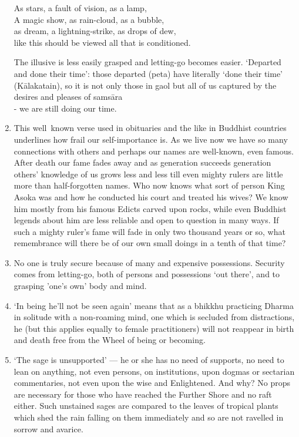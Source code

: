 \begin{enumerate}
\begin{MyDescription}{}
As stars, a fault of vision, as a lamp,\\
A magic show, as rain-cloud, as a bubble,\\
as dream, a lightning-strike, as drops of dew,\\
like this should be viewed all that is conditioned.
\end{MyDescription}
The illusive is less easily grasped and letting-go becomes easier. `Departed and done their time': those departed (peta) have literally `done their time' (K\=alakatain), so it is not only those in gaol but all of us captured by the desires and pleases of sams\=ara\\
- we are still doing our time.\\

\item This well~known verse used in obituaries and the like in Buddhist countries underlines how frail our self-importance is. As we live now we have so many connections with others and perhaps our names are well-known, even famous. After death our fame fades away and as generation succeeds generation others' knowledge of us grows less and less till even mighty rulers are little more than half-forgotten names. Who now knows what sort of person King Asoka was and how he conducted his court and treated his wives? We know him mostly from his famous Edicts carved upon rocks, while even Buddhist legends about him are less reliable and open to question in many ways. If such a mighty ruler's fame will fade in only two thousand years or so, what remembrance will there be of our own small doings in a tenth of that time?

\item No one is truly secure because of many and expensive possessions. Security comes from letting-go, both of persons and possessions `out there', and to grasping 'one's own' body and mind.

\item `In being he'll not be seen again' means that as a bhikkhu practicing Dharma in solitude with a non-roaming mind, one which is secluded from distractions, he (but this applies equally to female practitioners) will not reappear in birth and death free from the Wheel of being or becoming.\\

\item `The sage is unsupported' — he or she has no need of supports, no need to lean on anything, not even persons, on institutions, upon dogmas or sectarian commentaries, not even upon the wise and Enlightened. And why? No props are necessary for those who have reached the Further Shore and no raft either. Such unstained sages are compared to the leaves of tropical plants which shed the rain falling on them immediately and so are not ravelled in sorrow and avarice.\\


\end{enumerate}
